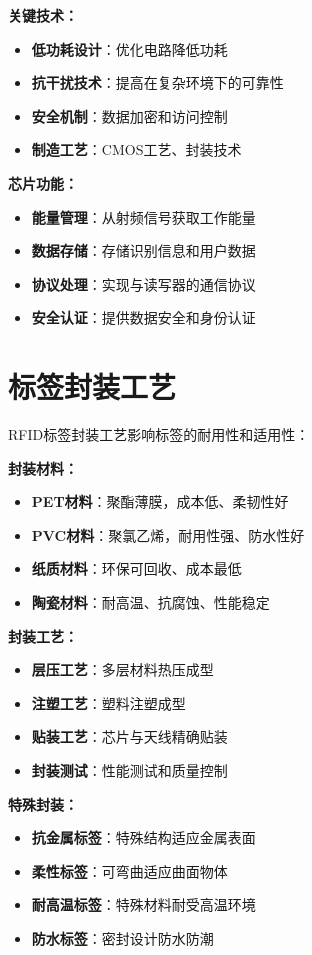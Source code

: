 \documentclass[12pt,UTF8]{ctexbook}
\begin{document}
\begin{itemize}[leftmargin=3.5em]
\begin{itemize}[leftmargin=3.5em]
\textbf{关键技术：}
\begin{itemize}[leftmargin=3.5em]
    \item \textbf{低功耗设计}：优化电路降低功耗
    \item \textbf{抗干扰技术}：提高在复杂环境下的可靠性
    \item \textbf{安全机制}：数据加密和访问控制
    \item \textbf{制造工艺}：CMOS工艺、封装技术
\end{itemize}

\textbf{芯片功能：}
\begin{itemize}[leftmargin=3.5em]
    \item \textbf{能量管理}：从射频信号获取工作能量
    \item \textbf{数据存储}：存储识别信息和用户数据
    \item \textbf{协议处理}：实现与读写器的通信协议
    \item \textbf{安全认证}：提供数据安全和身份认证
\end{itemize}

\section{标签封装工艺}

RFID标签封装工艺影响标签的耐用性和适用性：

\textbf{封装材料：}
\begin{itemize}[leftmargin=3.5em]
    \item \textbf{PET材料}：聚酯薄膜，成本低、柔韧性好
    \item \textbf{PVC材料}：聚氯乙烯，耐用性强、防水性好
    \item \textbf{纸质材料}：环保可回收、成本最低
    \item \textbf{陶瓷材料}：耐高温、抗腐蚀、性能稳定
\end{itemize}

\textbf{封装工艺：}
\begin{itemize}[leftmargin=3.5em]
    \item \textbf{层压工艺}：多层材料热压成型
    \item \textbf{注塑工艺}：塑料注塑成型
    \item \textbf{贴装工艺}：芯片与天线精确贴装
    \item \textbf{封装测试}：性能测试和质量控制
\end{itemize}

\textbf{特殊封装：}
\begin{itemize}[leftmargin=3.5em]
    \item \textbf{抗金属标签}：特殊结构适应金属表面
    \item \textbf{柔性标签}：可弯曲适应曲面物体
    \item \textbf{耐高温标签}：特殊材料耐受高温环境
    \item \textbf{防水标签}：密封设计防水防潮
\end{itemize}


\end{itemize}
\end{itemize}
\end{document}
